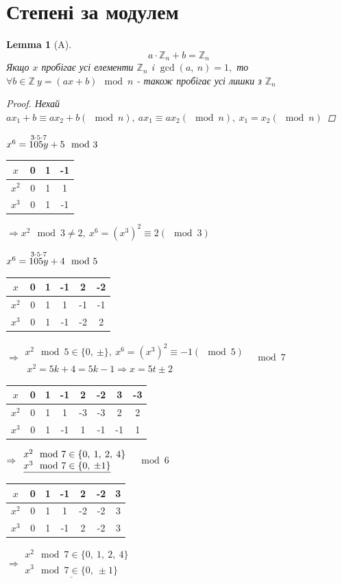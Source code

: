 \documentclass[a4paper,12pt, centered]{bookest}
\newtheorem{lemma}[theorem]{Lemma}
\begin{document}
\section{Степені за модулем}
\begin{lemma}[A]
$$a\cdot\mathbb{Z}_n+b=\mathbb{Z}_n$$
Якщо $x$ пробігає усі елементи $\mathbb{Z}_n$ i $\gcd(a,\>n)=1,$ то $\forall b\in\mathbb{Z}\>y=(ax+b)\mod n$ - також пробігає усі лишки з $\mathbb{Z}_n$ 
\begin{proof}
	$ $Нехай $ax_1+b\equiv ax_2+b(\mod n),\>ax_1\equiv ax_2(\mod n),\>x_1=x_2(\mod n)$
\end{proof}
\end{lemma}
\begin{example}
	$x^6=\overset{3\cdot 5\cdot 7}{105y}+5\\\mod 3$
	\\
		\begin{tabular}{c|c|c|c|}
			$x$ & 0 & 1 & -1\\\hline
			$x^2$ & 0 & 1 & 1\\\hline
			$x^3$ & 0 & 1 & -1
		\end{tabular} 
	$\Rightarrow x^2\mod 3\ne 2,\>x^6=(x^3)^2\equiv 2(\mod 3)$
\end{example}\newpage 
\begin{example}
	$x^6=\overset{3\cdot 5\cdot 7}{105y}+4\\\mod 5$
	\\
		\begin{tabular}{c|c|c|c|c|c|}
			$x$ & 0 & 1 & -1 & 2 & -2\\\hline
			$x^2$ & 0 & 1 & 1 & -1 & -1\\\hline
			$x^3$ & 0 & 1 & -1 & -2 & 2
		\end{tabular}  
	$\Rightarrow $$\begin{array}{l}		
 x^2\mod 5\in\{0,\>\pm\},\>x^6=(x^3)^2\equiv -1(\mod 5)\\\>x^2=5k+4=5k-1\Rightarrow x=5t\pm 2\end{array}$
 $\mod 7$
 \\
		\begin{tabular}{c|c|c|c|c|c|c|c|}
			$x$ & 0 & 1 & -1 & 2 & -2 & 3 & -3\\\hline
			$x^2$ & 0 & 1 & 1 & -3 & -3 & 2 & 2\\\hline
			$x^3$ & 0 & 1 & -1 & 1 & -1 & -1 & 1 
		\end{tabular} $\Rightarrow\begin{array}{l}
			x^2\mod 7 \in\{0,\>1,\>2,\>4\} \\ \underline{x^3\mod 7\in\{0,\>\pm1\}}
		\end{array}\\$
 $\mod 6$
 \\
		\begin{tabular}{c|c|c|c|c|c|c|}
			$x$ & 0 & 1 & -1 & 2 & -2 & 3\\\hline
			$x^2$ & 0 & 1 & 1 & -2 & -2 & 3\\\hline
			$x^3$ & 0 & 1 & -1 & 2 & -2 & 3
		\end{tabular} $\Rightarrow\begin{array}{l}
			x^2\mod 7 \in\{0,\>1,\>2,\>4\} \\ \underline{x^3\mod 7\in\{0,\>\pm1\}}
		\end{array}$
\end{example}
\end{document}
